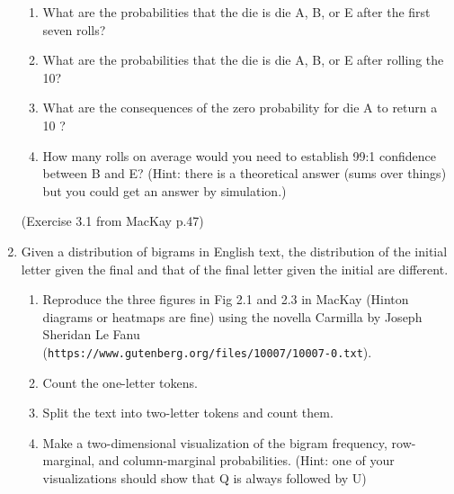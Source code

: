 \documentclass[12pt]{book}
\theoremstyle{definition}
\begin{document}
\begin{enumerate}
 \begin{enumerate}[label=\alph*)]
   \item  What are the probabilities that the die is die A, B, or E after the first seven rolls?
   \item  What are the probabilities that the die is die A, B, or E after rolling the 10?
   \item  What are the consequences of the zero probability for die A to return a 10 ? 
   \item  How many rolls on average would you need to establish 99:1 confidence between B and E?  (Hint: there is a theoretical answer (sums over things) but you could get an answer by simulation.)
 \end{enumerate}  

(Exercise 3.1 from MacKay p.47)

\item  Given a distribution of bigrams in English text, the distribution of the initial letter given the final and that of the final letter given the initial are different.  

 \begin{enumerate}[label=\alph*)] 
   \item  Reproduce the three figures in Fig 2.1 and 2.3 in MacKay  (Hinton diagrams or heatmaps are fine) using the novella Carmilla by Joseph Sheridan Le Fanu \\
(\texttt{https://www.gutenberg.org/files/10007/10007-0.txt}).   
   \item  Count the one-letter tokens.  
   \item  Split the text into two-letter tokens and count them.  
   \item  Make a two-dimensional visualization of the bigram frequency, row-marginal, and column-marginal probabilities.  (Hint: one of your visualizations should show that Q is always followed by U) 
 \end{enumerate}  

\end{enumerate}
\end{document}
